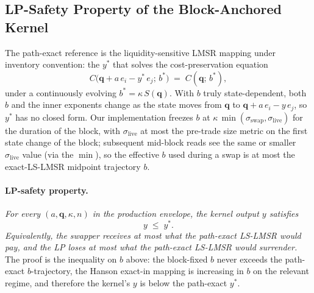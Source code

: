 \documentclass[11pt]{article}
\newcommand{\Sm}{S(\mathbf{q})}
\begin{document}
\subsection{LP-Safety Property of the Block-Anchored Kernel}
\label{sec:lp-safety}

The path-exact reference is the liquidity-sensitive LMSR mapping under
inventory convention: the $y^*$ that solves the cost-preservation
equation
\begin{equation}
  \label{eq:lslmsr}
  C\big(\mathbf{q} + a\,e_i - y^*\,e_j;\,b^*\big) \;=\; C(\mathbf{q};\,b^*),
\end{equation}
under a continuously evolving $b^* = \kappa\,\Sm$. With $b$ truly
state-dependent, both $b$ and the inner exponents change as the state
moves from $\mathbf{q}$ to $\mathbf{q} + a\,e_i - y\,e_j$, so $y^*$ has
no closed form. Our implementation freezes $b$ at
$\kappa\,\min(\sigma_{\mathrm{swap}}, \sigma_{\mathrm{live}})$ for the
duration of the block, with $\sigma_{\mathrm{live}}$ at most the
pre-trade size metric on the first state change of the block; subsequent
mid-block reads see the same or smaller $\sigma_{\mathrm{live}}$ value
(via the $\min$), so the effective $b$ used during a swap is at most the
exact-LS-LMSR midpoint trajectory $b$.

\paragraph{LP-safety property.}
\emph{For every $(a, \mathbf{q}, \kappa, n)$ in the production envelope,
the kernel output $y$ satisfies}
\[
  y \;\le\; y^*.
\]
\emph{Equivalently, the swapper receives at most what the path-exact
LS-LMSR would pay, and the LP loses at most what the path-exact LS-LMSR
would surrender.} The proof is the inequality on $b$ above: the
block-fixed $b$ never exceeds the path-exact $b$-trajectory, the Hanson
exact-in mapping is increasing in $b$ on the relevant regime, and
therefore the kernel's $y$ is below the path-exact $y^*$.
\end{document}
